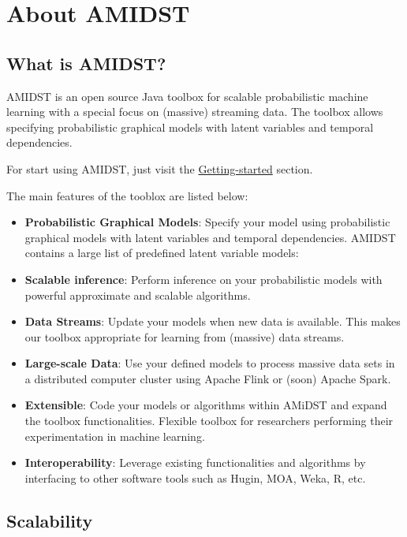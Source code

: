 \documentclass[10pt,a4paper]{article}
\begin{document}
	
	\section{About AMIDST}
	
	
	\subsection{What is AMIDST?}

AMIDST is an open source Java toolbox for scalable probabilistic machine learning with a special focus on (massive) streaming data. The toolbox allows  specifying  probabilistic graphical models with latent variables and temporal dependencies. 

For start using AMIDST, just visit the \href{getting-started.html}{Getting-started} section.

The main features of the tooblox are listed below: 
	
	\begin{itemize}
\item\textbf{ Probabilistic Graphical Models}: Specify your model using probabilistic graphical models with latent variables and temporal dependencies. AMIDST contains a large list of predefined latent variable models:


\item \textbf{Scalable inference}: Perform inference on your probabilistic models with powerful approximate and scalable algorithms.

\item \textbf{Data Streams}: Update your models when new data is available. This makes our toolbox appropriate for learning from (massive) data streams.

\item \textbf{Large-scale Data}: Use your defined models to process massive data sets in a distributed computer cluster using Apache Flink or (soon) Apache Spark.

\item \textbf{Extensible}: Code your models or algorithms within AMiDST and expand the toolbox functionalities. Flexible toolbox for researchers performing their experimentation in machine learning.

\item \textbf{Interoperability}: Leverage existing functionalities and algorithms by interfacing to other software tools such as Hugin, MOA, Weka, R, etc.
	\end{itemize}


\subsection{Scalability}
\end{document}
